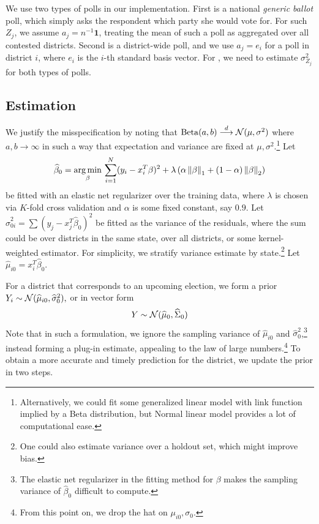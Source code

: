 \documentclass[11pt]{article}
\begin{document}
We use two types of polls in our implementation. First is a national
\emph{generic ballot} poll, which simply asks the respondent which party she
would vote for. For such $Z_j$, we assume $a_j = n^{-1} \bm 1$, treating the
mean of such a poll as aggregated over all contested districts. Second is a
district-wide poll, and we use $a_j = e_i$ for a poll in district $i$, where
$e_i$ is the $i$-th standard basis vector. For , we need to
estimate $\sigma_{Z_j}^2$ for both types of polls.

\subsection{Estimation}
\label{sec:estimate}



We justify the misspecification by noting that $\operatorname{Beta}(a,b) \overset{d}{\longrightarrow}
\mathcal{N}(\mu,\sigma^2)$ where $a, b \to \infty$ in such a way that expectation and
variance are fixed at $\mu,\sigma^2$.\footnote{Alternatively, we could fit some
generalized linear model with link function implied by a Beta distribution, but
Normal linear model provides a lot of computational ease.} Let \begin{align*}
\widehat \beta_0 = \operatorname*{arg\,min}_\beta \, \sum_{i=1}^{N} (y_i - x_i^T \beta)^2 + \lambda\left({\alpha \left\lVert\beta\right\rVert_1 + (1-\alpha) \left\lVert\beta\right\rVert_2}\right)
\end{align*}
be fitted with an elastic net regularizer over the training data, where $\lambda$ is chosen via $K$-fold cross validation and $\alpha$ is some fixed constant, say $0.9$. Let $\hat \sigma_{0i}^2 = \sum (y_j - x_j^T \hat\beta_0)^2$ be fitted as the variance of the residuals, where the sum could be over districts in the same state, over all districts, or some kernel-weighted estimator. For simplicity, we stratify variance estimate by state.\footnote{One could also estimate variance over a holdout set, which might improve bias.} Let $\hat \mu_{i0} = x_i^T \hat \beta_0$.

For a district that corresponds to an upcoming election, we form a prior 
$Y_i\sim \mathcal{N}(\widehat \mu_{i0}, \widehat \sigma_0^2),$ or in vector form \[
Y \sim \mathcal{N}(\widehat \mu_0, \widehat \Sigma_0)
\]
Note that in such a formulation, we ignore the sampling variance of $\hat \mu_{i0}$ and $\hat \sigma_0^2$,\footnote{The elastic net regularizer in the fitting method for $\beta$ makes the sampling variance of $\hat\beta_0$ difficult to compute.} instead forming a plug-in estimate, appealing to the law of large numbers.\footnote{From this point on, we drop the hat on $\mu_{i0}, \sigma_0$.} To obtain a more accurate and timely prediction for the district, we update the prior in two steps.  
\end{document}
